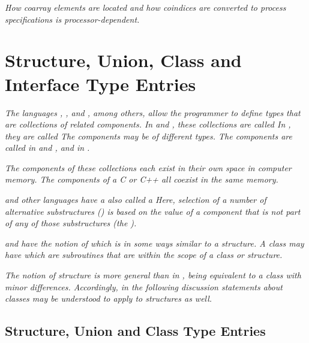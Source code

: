 \textit{How coarray elements are located and how coindices are 
converted to process specifications is processor-dependent.}

\section{Structure, Union, Class and Interface Type Entries}
\label{chap:structureunionclassandinterfacetypeentries}

\textit{The languages 
, 
, and 
, among others, allow the
programmer to define types that are collections of related
components. 
In  and , these collections are called
In , they are called 
The components may be of different types. The components are
called  in  and 
, and  in .}

\textit{The components of these collections each exist in their
own space in computer memory. The components of a C or C++
 all coexist in the same memory.}

\textit{ and 
other languages have a 
also called a  Here, selection of a
number of alternative substructures () is based
on the value of a component that is not part of any of those
substructures (the ).}

\textit{ and 
 have the notion of  which is in some
ways similar to a structure. A class may have  which are subroutines that are within the scope
of a class or structure.}

\textit{The  notion of 
structure is more general than in , being
equivalent to a class with minor differences. Accordingly,
in the following discussion statements about 
 classes may
be understood to apply to  structures as well.}

\subsection{Structure, Union and Class Type Entries}
\label{chap:structureunionandclasstypeentries}


